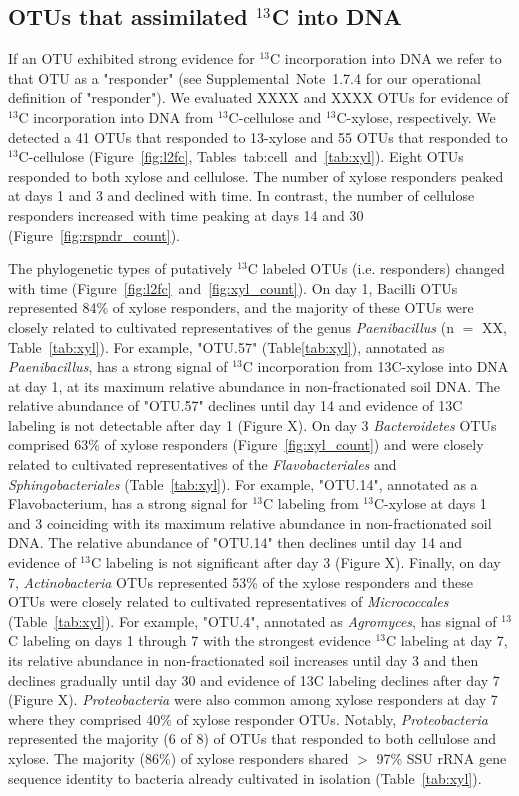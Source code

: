 \subsection{OTUs that assimilated $^{13}$C into DNA} \label{responders}
If an OTU exhibited strong evidence for $^{13}$C incorporation into DNA we
refer to that OTU as a "responder" (see Supplemental Note 1.7.4 for our
operational definition of "responder"). We evaluated XXXX and XXXX OTUs for
evidence of $^{13}$C incorporation into DNA from $^{13}$C-cellulose and
$^{13}$C-xylose, respectively. We detected a 41 OTUs that responded to
13-xylose and 55 OTUs that responded to $^{13}$C-cellulose (Figure~\ref{fig:l2fc}, 
Tables~{tab:cell}~and~\ref{tab:xyl}). Eight OTUs responded to both xylose and
cellulose. The number of xylose responders peaked at days 1 and 3 and declined
with time. In contrast, the number of cellulose responders increased with time
peaking at days 14 and 30 (Figure~\ref{fig:rspndr_count}). 

The phylogenetic types of putatively $^{13}$C labeled OTUs (i.e. responders)
changed with time (Figure~\ref{fig:l2fc}~and~\ref{fig:xyl_count}). On day 1,
Bacilli OTUs represented 84\% of xylose responders, and the majority of these
OTUs were closely related to cultivated representatives of the genus
\textit{Paenibacillus} (n $=$ XX, Table~\ref{tab:xyl}). For example, "OTU.57"
(Table\ref{tab:xyl}), annotated as \textit{Paenibacillus}, has a strong signal
of $^{13}$C incorporation from 13C-xylose into DNA at day 1, at its maximum
relative abundance in non-fractionated soil DNA. The relative abundance of
"OTU.57" declines until day 14 and evidence of 13C labeling is not detectable
after day 1 (Figure X). On day 3 \textit{Bacteroidetes} OTUs comprised 63\% of
xylose responders (Figure~\ref{fig:xyl_count}) and were closely related to
cultivated representatives of the \textit{Flavobacteriales} and
\textit{Sphingobacteriales} (Table~\ref{tab:xyl}). For example, "OTU.14",
annotated as a Flavobacterium, has a strong signal for $^{13}$C labeling
from $^{13}$C-xylose at days 1 and 3 coinciding with its maximum relative
abundance in non-fractionated soil DNA. The relative abundance of "OTU.14" then
declines until day 14 and evidence of $^{13}$C  labeling is not significant
after day 3 (Figure X). Finally, on day 7, \textit{Actinobacteria} OTUs
represented 53\% of the xylose responders and these OTUs were closely related
to cultivated representatives of \textit{Micrococcales} (Table~\ref{tab:xyl}).
For example, "OTU.4", annotated as \textit{Agromyces}, has signal of $^{13}$C
labeling on days 1 through 7 with the strongest evidence $^{13}$C labeling
at day 7, its relative abundance in non-fractionated soil increases until day
3 and then declines gradually until day 30 and evidence of 13C labeling
declines after day 7 (Figure X). \textit{Proteobacteria} were also common
among xylose responders at day 7 where they comprised 40\% of xylose responder
OTUs. Notably, \textit{Proteobacteria} represented the majority (6 of
8) of OTUs that responded to both cellulose and xylose. The
majority (86\%) of xylose responders shared $>$ 97\% SSU rRNA gene
sequence identity to bacteria already cultivated in isolation
(Table~\ref{tab:xyl}). 

